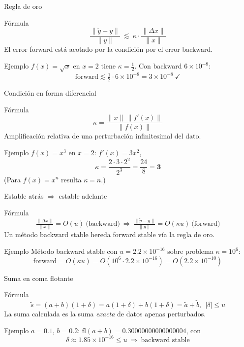 \documentclass[aspectratio=169,10pt]{beamer}
\begin{document}
\begin{frame}{Regla de oro}
\begin{cardidea}{Fórmula}{\faSuperscript}
\[ \frac{\|\tilde y-y\|}{\|y\|}\ \lesssim\ \kappa\cdot\frac{\|\Delta x\|}{\|x\|} \]
El error forward está acotado por la condición por el error backward.
\end{cardidea}
\vspace{1.5mm}
\begin{cardgear}{Ejemplo}{\faCalculator}
$f(x)=\sqrt x$ en $x=2$ tiene $\kappa=\tfrac12$. Con backward $6\times10^{-8}$:
\[ \text{forward}\lesssim \tfrac12\cdot 6\times10^{-8}=3\times10^{-8}\ \checkmark \]
\end{cardgear}
\end{frame}

\begin{frame}{Condición en forma diferencial}
\begin{cardidea}{Fórmula}{\faSuperscript}
\[ \kappa=\frac{\|x\|\,\|f'(x)\|}{\|f(x)\|} \]
Amplificación relativa de una perturbación infinitesimal del dato.
\end{cardidea}
\vspace{1.5mm}
\begin{cardgear}{Ejemplo}{\faCalculator}
$f(x)=x^3$ en $x=2$: $f'(x)=3x^2$,
\[ \kappa=\frac{2\cdot 3\cdot 2^2}{2^3}=\frac{24}{8}=\mathbf{3} \]
(Para $f(x)=x^n$ resulta $\kappa=n$.)
\end{cardgear}
\end{frame}

\begin{frame}{Estable atrás $\Rightarrow$ estable adelante}
\begin{cardidea}{Fórmula}{\faSuperscript}
\[ \tfrac{\|\Delta x\|}{\|x\|}=O(u)\ \text{(backward)}\ \Rightarrow\ \tfrac{\|\tilde y-y\|}{\|y\|}=O(\kappa u)\ \text{(forward)} \]
Un método backward stable hereda forward stable vía la regla de oro.
\end{cardidea}
\vspace{1.5mm}
\begin{cardgear}{Ejemplo}{\faCalculator}
Método backward stable con $u=2.2\times10^{-16}$ sobre problema $\kappa=10^{6}$:
\[ \text{forward}=O(\kappa u)=O(10^{6}\cdot 2.2\times10^{-16})=O(2.2\times10^{-10}) \]
\end{cardgear}
\end{frame}

\begin{frame}{Suma en coma flotante}
\begin{cardidea}{Fórmula}{\faSuperscript}
\[ \tilde s=(a+b)(1+\delta)=a(1+\delta)+b(1+\delta)=\tilde a+\tilde b,\ \ |\delta|\le u \]
La suma calculada es la suma \emph{exacta} de datos apenas perturbados.
\end{cardidea}
\vspace{1.5mm}
\begin{cardgear}{Ejemplo}{\faCalculator}
$a=0.1$, $b=0.2$: $\mathrm{fl}(a+b)=0.30000000000000004$, con
\[ \delta\approx 1.85\times10^{-16}\le u\ \Rightarrow\ \text{backward stable} \]
\end{cardgear}
\end{frame}
\end{document}
